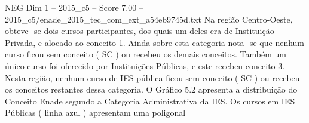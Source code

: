 \begin{textsample}{NEG Dim 1 – 2015\_c5 – Score 7.00 – 2015\_c5/enade\_2015\_tec\_com\_ext\_a54eb9745d.txt}
Na região Centro-Oeste, obteve -se dois cursos participantes, dos quais um deles era de Instituição Privada, e alocado ao conceito 1.
Ainda sobre esta categoria nota -se que nenhum curso ficou sem conceito ( SC ) ou recebeu os demais conceitos.
Também um único curso foi oferecido por Instituições Públicas, e este recebeu conceito 3.
Nesta região, nenhum curso de IES pública ficou sem conceito ( SC ) ou recebeu os conceitos restantes dessa categoria.
O Gráfico 5.2 apresenta a distribuição do Conceito Enade segundo a Categoria Administrativa da IES.
Os cursos em IES Públicas ( linha azul ) apresentam uma poligonal

\end{textsample}
